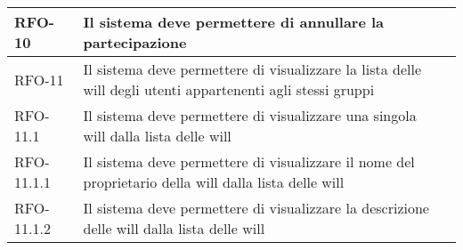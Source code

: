 \begin{center}
{\begin{longtable}{
      |>{\centering\arraybackslash}p{60pt}
      |>{\centering\arraybackslash}p{220pt}
      |>{\centering\arraybackslash}p{60pt}|}
      RFO-10                                                               & Il
      sistema deve permettere di annullare la partecipazione
                                                                           &
      \nameref{uc:scenario-annulla-partecipazione}                              \\
      \hline

      RFO-11                                                               & Il
      sistema deve permettere di visualizzare la lista delle
      \gls{will} degli utenti appartenenti agli stessi gruppi           &
      \nameref{uc:scenario-visualizzazione-will}
      \\
      \hline

      RFO-11.1                                                             & Il
      sistema deve permettere di visualizzare una singola
      \gls{will} dalla lista delle \gls{will}                              &
      \nameref{sub:visualizzazione-singola-will}
      \\
      \hline

      RFO-11.1.1                                                           & Il
      sistema deve permettere di visualizzare il nome del
      proprietario della \gls{will} dalla lista delle \gls{will}           &
      \nameref{subsub:visualizzazione-will-nome-proprietario}
      \\

      \hline

      RFO-11.1.2                                                           & Il
      sistema deve permettere di visualizzare la
      descrizione delle \gls{will} dalla lista delle \gls{will}            &
      \nameref{subsub:visualizzazione-will-descrizione}
      \\

      \hline
    \end{longtable}
    \renewcommand{\arraystretch}{1}
  }

\end{center}